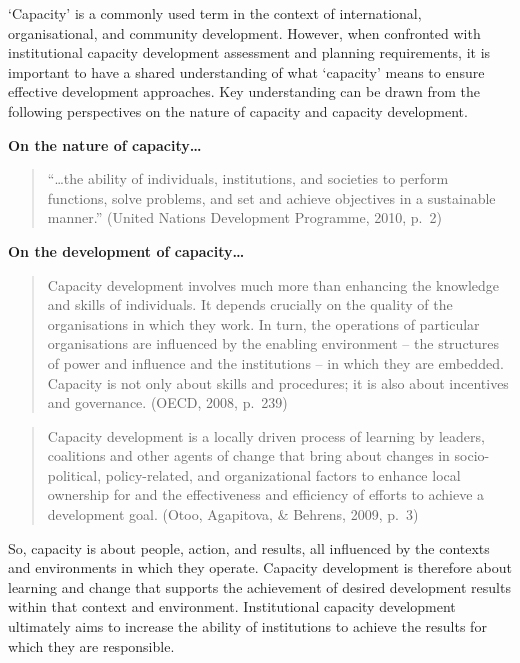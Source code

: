 \documentclass[
  10pt,
]{report}
\begin{document}
`Capacity' is a commonly used term in the context of international,
organisational, and community development. However, when confronted with
institutional capacity development assessment and planning requirements,
it is important to have a shared understanding of what `capacity' means
to ensure effective development approaches. Key understanding can be
drawn from the following perspectives on the nature of capacity and
capacity development.

\textbf{On the nature of capacity\ldots{}}

\begin{quote}
``\ldots the ability of individuals, institutions, and societies to
perform functions, solve problems, and set and achieve objectives in a
sustainable manner.'' (United Nations Development Programme, 2010, p.~2)
\end{quote}

\textbf{On the development of capacity\ldots{}}

\begin{quote}
Capacity development involves much more than enhancing the knowledge and
skills of individuals. It depends crucially on the quality of the
organisations in which they work. In turn, the operations of particular
organisations are influenced by the enabling environment -- the
structures of power and influence and the institutions -- in which they
are embedded. Capacity is not only about skills and procedures; it is
also about incentives and governance. (OECD, 2008, p.~239)
\end{quote}

\begin{quote}
Capacity development is a locally driven process of learning by leaders,
coalitions and other agents of change that bring about changes in
socio-political, policy-related, and organizational factors to enhance
local ownership for and the effectiveness and efficiency of efforts to
achieve a development goal. (Otoo, Agapitova, \& Behrens, 2009, p.~3)
\end{quote}

So, capacity is about people, action, and results, all influenced by the
contexts and environments in which they operate. Capacity development is
therefore about learning and change that supports the achievement of
desired development results within that context and environment.
Institutional capacity development ultimately aims to increase the
ability of institutions to achieve the results for which they are
responsible.
\end{document}
